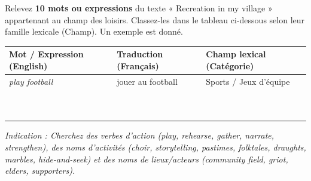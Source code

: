 \documentclass[11pt]{article}
\newcommand{\eng}[1]{\ifmmode\text{\textit{#1}}\else\begingroup\selectlanguage{english}\itshape #1\endgroup\fi}
\begin{document}
\begin{exercice}
Relevez \textbf{10 mots ou expressions} du texte « Recreation in my village » appartenant au champ des loisirs. Classez-les dans le tableau ci-dessous selon leur famille lexicale (Champ). Un exemple est donné.
\begin{center}
\begin{tabularx}{\linewidth}{|X|X|X|}\hline
\rowcolor{poppurpleL} \textbf{Mot / Expression (English)} & \textbf{Traduction (Français)} & \textbf{Champ lexical (Catégorie)} \\ \hline
\eng{play football} & jouer au football & Sports / Jeux d'équipe \\ \hline
 &  &  \\ \hline
 &  &  \\ \hline
 &  &  \\ \hline
 &  &  \\ \hline
 &  &  \\ \hline
 &  &  \\ \hline
 &  &  \\ \hline
 &  &  \\ \hline
 &  &  \\ \hline
 &  &  \\ \hline
\end{tabularx}
\end{center}
\emph{Indication : Cherchez des verbes d'action (play, rehearse, gather, narrate, strengthen), des noms d'activités (choir, storytelling, pastimes, folktales, draughts, marbles, hide-and-seek) et des noms de lieux/acteurs (community field, griot, elders, supporters).}
\end{exercice}
\end{document}

